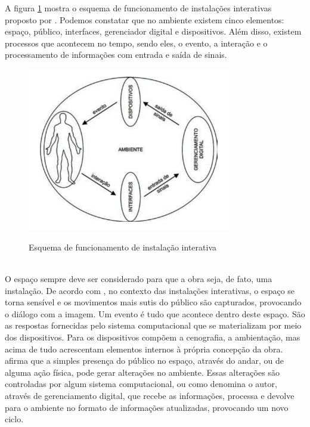 A figura \ref{fig:instalacoes_interativas} mostra o esquema de funcionamento de instalações interativas proposto por . Podemos constatar que no ambiente existem cinco elementos: espaço, público, interfaces, gerenciador digital e dispositivos. Além disso, existem processos que acontecem no tempo, sendo eles, o evento, a interação e o processamento de informações com entrada e saída de sinais. 

\begin{figure}[H]
    \centering
    \caption{Esquema de funcionamento de instalação interativa}
	\vspace*{0,2cm}
    \includegraphics[width=0.8\textwidth]{./04-figuras/instalacoes_interativas}
    \label{fig:instalacoes_interativas}
\end{figure}
\vspace*{-0,9cm}
{\raggedright {}}\\


O espaço sempre deve ser considerado para que a obra seja, de fato, uma instalação. De acordo com , no contexto das instalações interativas, o espaço se torna sensível e os movimentos mais sutis do público são capturados, provocando o diálogo com a imagem. Um evento é tudo que acontece dentro deste espaço. São as respostas fornecidas pelo sistema computacional que se materializam por meio dos dispositivos. Para  os dispositivos compõem a cenografia, a
ambientação, mas acima de tudo acrescentam elementos internos à própria concepção
da obra.  afirma que a simples presença do público no espaço, através do andar, ou de alguma ação física, pode gerar alterações no ambiente. Essas alterações são controladas por algum sistema computacional, ou como denomina o autor, através de gerenciamento digital, que recebe as informações, processa e devolve para o ambiente no formato de informações atualizadas, provocando um novo ciclo.


